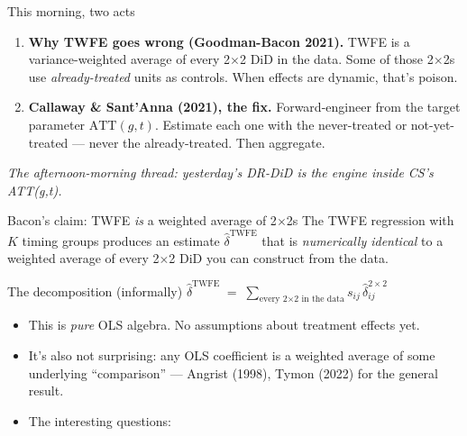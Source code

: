 \documentclass[aspectratio=169,11pt]{beamer}
\begin{document}
\begin{frame}{This morning, two acts}
\vspace{0.4em}
\begin{enumerate}
  \item \textbf{Why TWFE goes wrong (Goodman-Bacon 2021).} \;TWFE is a variance-weighted average of every 2$\times$2 DiD in the data. \;Some of those 2$\times$2s use \textit{already-treated} units as controls. \;When effects are dynamic, that's poison.
  \vspace{0.3em}
  \item \textbf{Callaway \& Sant'Anna (2021), the fix.} \;Forward-engineer from the target parameter $\text{ATT}(g,t)$. \;Estimate each one with the never-treated or not-yet-treated --- never the already-treated. \;Then aggregate.
\end{enumerate}

\vspace{0.6em}
\begin{center}
\small\color{warmgray}\itshape
The afternoon-morning thread: yesterday's DR-DiD is the engine inside CS's ATT(g,t).
\end{center}
\end{frame}


\begin{frame}{Bacon's claim: TWFE \textit{is} a weighted average of 2$\times$2s}
\vspace{0.4em}
The TWFE regression with $K$ timing groups produces an estimate $\widehat{\delta}^{\text{TWFE}}$ that is \textit{numerically identical} to a weighted average of every 2$\times$2 DiD you can construct from the data.
\vspace{0.6em}

\begin{block}{The decomposition (informally)}
\centering
$\widehat{\delta}^{\text{TWFE}} \;=\; \displaystyle\sum_{\text{every 2}\times\text{2 in the data}} s_{ij}\, \widehat{\delta}^{2\times 2}_{ij}$
\end{block}

\vspace{0.6em}
\begin{itemize}\small
  \item This is \textit{pure} OLS algebra. \;No assumptions about treatment effects yet.
  \item It's also not surprising: any OLS coefficient is a weighted average of some underlying ``comparison'' --- Angrist (1998), Tymon (2022) for the general result.
  \item The interesting questions: \;
\end{itemize}
\end{frame}
\end{document}
